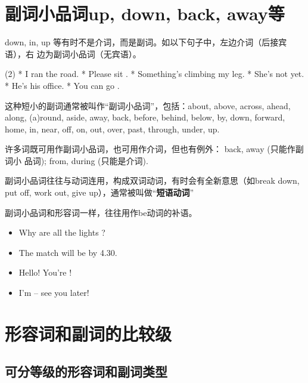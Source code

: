 


\section{副词小品词up, down, back, away等}

down, in, up 等有时不是介词，而是副词。如以下句子中，左边介词（后接宾语），右
边为副词小品词（无宾语）。
\begin{taskitem}(2)
* I ran  the road.
* Please sit .
* Something's climbing  my leg.
* She's not  yet.
* He's  his office.
* You can go .
\end{taskitem}

这种短小的副词通常被叫作“副词小品词”，包括：about, above, across, ahead,
along, (a)round, aside, away, back, before, behind, below, by, down,
forward, home, in, near, off, on, out, over, past, through, under, up.

许多词既可用作副词小品词，也可用作介词，但也有例外： back, away (只能作副词小
品词); from, during (只能是介词).

副词小品词往往与动词连用，构成双词动词，有时会有全新意思（如break down, put
off, work out, give up），通常被叫做“\textbf{短语动词}”

副词小品词和形容词一样，往往用作be动词的补语。
\begin{itemize}
\item Why are all the lights ?
\item The match will be  by 4.30.
\item Hello! You're !
\item I'm  – see you later!
\end{itemize}

\section{形容词和副词的比较级}

\subsection{可分等级的形容词和副词类型}


